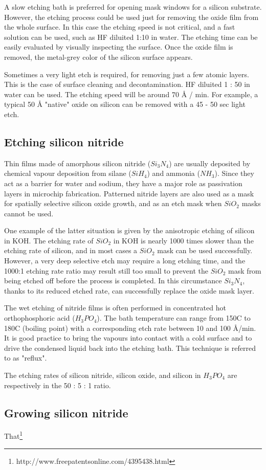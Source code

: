 A slow etching bath is preferred for opening mask windows for a silicon substrate.
However, the etching process could be used just for removing the oxide film from the whole surface.
In this case the etching speed is not critical, and a fast solution can be used, such as HF diluited 1:10 in water.
The etching time can be easily evaluated by visually inspecting the surface.
Once the oxide film is removed, the metal-grey color of the silicon surface appears.

Sometimes a very light etch is required, for removing just a few atomic layers.
This is the case of surface cleaning and decontamination. HF diluited 1 : 50 in water can be used.
The etching speed will be around 70 Å / min. For example, a typical 50 Å "native" oxide on silicon can be removed with a 45 - 50 sec light etch.

\newpage

\subsection{Etching silicon nitride}
Thin films made of amorphous silicon nitride ($Si_3N_4$) are usually deposited by chemical vapour deposition from silane ($SiH_4$) and ammonia ($NH_3$).
Since they act as a barrier for water and sodium, they have a major role as passivation layers in microchip fabrication.
Patterned nitride layers are also used as a mask for spatially selective silicon oxide growth, and as an etch mask when $SiO_2$ masks cannot be used.

One example of the latter situation is given by the anisotropic etching of silicon in KOH.
The etching rate of $SiO_2$ in KOH is nearly 1000 times slower than the etching rate of silicon, and in most cases a $SiO_2$ mask can be used successfully.
However, a very deep selective etch may require a long etching time, and the 1000:1 etching rate ratio may result still too small to prevent the $SiO_2$ mask from being etched off before the process is completed.
In this circumstance $Si_3N_4$, thanks to its reduced etched rate, can successfully replace the oxide mask layer.

The wet etching of nitride films is often performed in concentrated hot orthophosphoric acid ($H_3PO_4$).
The bath temperature can range from 150\degree C to 180\degree C (boiling point) with a corresponding etch rate between 10 and 100 Å/min.
It is good practice to bring the vapours into contact with a cold surface and to drive the condensed liquid back into the etching bath.
This technique is referred to as "reflux".\label{chemistry_reflux}

The etching rates of silicon nitride, silicon oxide, and silicon in $H_3PO_4$ are respectively in the 50 : 5 : 1 ratio.

\subsection{Growing silicon nitride}
That\footnote{http://www.freepatentsonline.com/4395438.html}